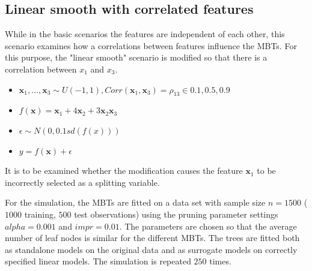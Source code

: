 \subsection{Linear smooth with correlated features}
While in the basic scenarios the features are independent of each other, this scenario examines how a correlations between features influence the MBTs. For this purpose, the "linear smooth" scenario is modified so that there is a correlation between $x_1$ and $x_3$.
\begin{itemize}
    \item $\textbf{x}_1,..., \textbf{x}_3 \sim U(-1,1), Corr(\textbf{x}_1, \textbf{x}_3) = \rho_{13} \in {0.1, 0.5, 0.9}$
    \item $ f(\textbf{x}) = \textbf{x}_1 + 4   \textbf{x}_2 + 3   \textbf{x}_2   \textbf{x}_3 $
    \item $\epsilon \sim N(0, 0.1 sd(f(x)))$
    \item $y = f(\textbf{x}) + \epsilon$
\end{itemize}

              
It is to be examined whether the modification causes the feature $\textbf{x}_1$ to be incorrectly selected as a splitting variable.


For the simulation, the MBTs are fitted on a data set with sample size $ n = 1500$ ($1000$ training, $500$ test observations) using the pruning parameter settings $alpha = 0.001$ and $impr = 0.01$. The parameters are chosen so that the average number of leaf nodes is similar for the different MBTs. The trees are fitted both as standalone models on the original data and as surrogate models on correctly specified linear models. The simulation is repeated $250$ times.


